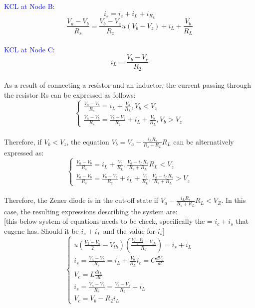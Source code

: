 \textcolor{blue}{KCL at Node B:}\\
\begin{equation}
    i_s=i_z+i_L+i_{R_L}
\end{equation}
\begin{equation}
    \frac{V_a-V_b}{R_s}=\frac{V_b-V_z}{R_z}u(V_b-V_z)+i_L+\frac{V_b}{R_L}
\end{equation}\\

\textcolor{blue}{KCL at Node C:}\\
\begin{equation}
    i_L=\frac{V_b-V_c}{R_2}
\end{equation}\\

As a result of connecting a resistor and an inductor, the current passing through the resistor Rs can be expressed as follows:\\

\begin{equation}
    \begin{cases}
        \frac{V_a-V_b}{R_s}=i_L+\frac{V_b}{R_L},  V_b<V_z\\
        \frac{V_a-V_b}{R_s}=\frac{V_b-V_z}{R_z}+i_L+\frac{V_b}{R_L},  V_b>V_z
    \end{cases}
\end{equation}\\

Therefore, if $V_b < V_z$, the equation $V_b = V_a - \frac{i_L R_s}{R_s+R_L} R_L$ can be alternatively expressed as:\\

\begin{equation}
    \begin{cases}
        \frac{V_a-V_b}{R_s}=i_L+\frac{V_b}{R_L},  \frac{V_a-i_LR_s}{R_s+R_L}R_L<V_z\\
        \frac{V_a-V_b}{R_s}=\frac{V_b-V_z}{R_z}+i_L+\frac{V_b}{R_L},  \frac{V_a-i_LR_s}{R_s+R_L}>V_z
    \end{cases}
\end{equation}\\

Therefore, the Zener diode is in the cut-off state if $V_a - \frac{i_L R_s}{R_s+R_L} R_L < V_Z$. In this case, the resulting expressions describing the system are:\\


[this below system of equations needs to be check, specifically the = $i_c+i_s$ that eugene has. Should it be $i_s+i_L$ and the value for $i_s $]
\begin{equation}
    \begin{cases}
        u(\frac{V_2-V_a}{2}-V_{th})(\frac{\frac{V_2-V_a}{2}-V_{th}}{R_d})=i_s+i_L\\
        i_s=\frac{V_a-V_b}{R_s}=i_L+\frac{V_b}{R_L}
        i_c=C\frac{dV_a}{dt}\\
        V_c=L\frac{di_L}{dt}\\
        i_s=\frac{V_a-V_b}{R_s}=\frac{V_b-V_z}{R_z}+i_L\\
        V_c=V_b-R_2i_L
    \end{cases}
\end{equation}\\


